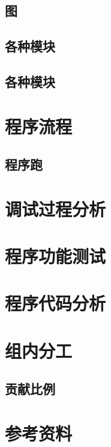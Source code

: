 \documentclass{ctexart}
\begin{document}
        \subsection{图}
        \subsection{各种模块}
        \subsection{各种模块}
    \section{程序流程} 
        \subsection{程序跑}
    \section{调试过程分析}
    \section{程序功能测试}
    \section{程序代码分析}
    \section{组内分工}
        \subsection{贡献比例}
    \section{参考资料}
    
\end{document}
